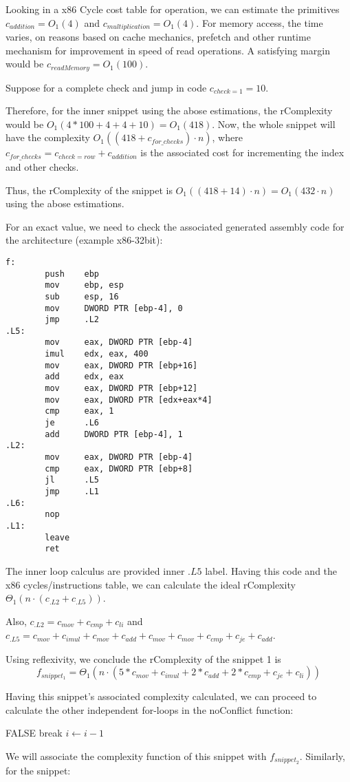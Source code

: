 Looking in a x86 Cycle cost table for operation, we can estimate the primitives $c_{addition} = O_{1}(4)$ and $c_{multiplication} = O_{1}(4)$. For memory access, the time varies, on reasons based on cache mechanics, prefetch and other runtime mechanism for improvement in speed of read operations. A satisfying margin would be $c_{readMemory} = O_{1}(100)$. 

Suppose for a complete check and jump in code $c_{check=1} = 10$.

Therefore, for the inner snippet using the abose estimations, the rComplexity would be $O_{1}(4 * 100 + 4 + 4 + 10) = O_{1}(418)$. Now, the whole snippet will have the complexity $O_{1}((418 + c_{for\_checks}) \cdot n)$, where  $c_{for\_checks} = c_{check=row} + c_{addition}$ is the associated cost for incrementing the index and other checks. 

Thus, the rComplexity of the snippet is $O_{1}((418 + 14) \cdot n) = O_{1}(432 \cdot n)$ using the abose estimations.

 
For an exact value, we need to check the associated generated assembly code for the architecture (example x86-32bit):
\begin{verbatim}
f:
        push    ebp
        mov     ebp, esp
        sub     esp, 16
        mov     DWORD PTR [ebp-4], 0
        jmp     .L2
.L5:
        mov     eax, DWORD PTR [ebp-4]
        imul    edx, eax, 400
        mov     eax, DWORD PTR [ebp+16]
        add     edx, eax
        mov     eax, DWORD PTR [ebp+12]
        mov     eax, DWORD PTR [edx+eax*4]
        cmp     eax, 1
        je      .L6
        add     DWORD PTR [ebp-4], 1
.L2:
        mov     eax, DWORD PTR [ebp-4]
        cmp     eax, DWORD PTR [ebp+8]
        jl      .L5
        jmp     .L1
.L6:
        nop
.L1:
        leave
        ret  
\end{verbatim}


The inner loop calculus are provided inner $.L5$ label. Having this code and the x86 cycles/instructions table, we can calculate the ideal rComplexity $\Theta_{1}(n \cdot (c_{.L2} + c_{.L5}))$. 

Also, $c_{.L2} = c_{mov} + c_{cmp} + c_{li}$ and $c_{.L5} = c_{mov} + c_{imul} + c_{mov} +  c_{add} + c_{mov} + c_{mov} + c_{cmp} + c_{je} + c_{add} $. 

Using reflexivity, we conclude the rComplexity of the snippet 1 is \[f_{snippet_{1}} =  \Theta_{1}(n \cdot ( 5 * c_{mov} + c_{imul} + 2 * c_{add} +2 *  c_{cmp} + c_{je} + c_{li}))\]

Having this snippet's associated complexity calculated, we can proceed to calculate the other independent for-loops in the noConflict function:
\begin{algorithmic}[1]
			\State \Return FALSE
		\EndIf
		\State break
	\EndIf
	\State $i \gets i-1$	
	\EndFor
\end{algorithmic}
We will associate the complexity function of this snippet with $f_{snippet_{2}}$. Similarly, for the snippet:

